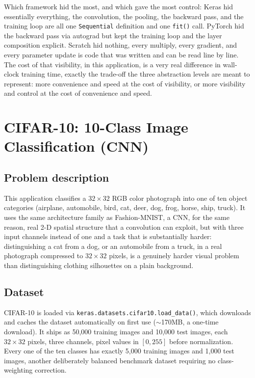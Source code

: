 \documentclass[11pt]{article}
\newcommand{\code}[1]{\texttt{#1}}
\begin{document}
Which framework hid the most, and which gave the most control: Keras hid
essentially everything, the convolution, the pooling, the backward pass, and
the training loop are all one \code{Sequential} definition and one
\code{fit()} call. PyTorch hid the backward pass via autograd but kept the
training loop and the layer composition explicit. Scratch hid nothing, every
multiply, every gradient, and every parameter update is code that was written
and can be read line by line. The cost of that visibility, in this
application, is a very real difference in wall-clock training time, exactly
the trade-off the three abstraction levels are meant to represent: more
convenience and speed at the cost of visibility, or more visibility and
control at the cost of convenience and speed.

\newpage
\section{CIFAR-10: 10-Class Image Classification (CNN)}
\label{sec:cifar10}

\subsection{Problem description}

This application classifies a $32\times32$ RGB color photograph into one of
ten object categories (airplane, automobile, bird, cat, deer, dog, frog,
horse, ship, truck). It uses the same architecture family as Fashion-MNIST,
a CNN, for the same reason, real 2-D spatial structure that a convolution can
exploit, but with three input channels instead of one and a task that is
substantially harder: distinguishing a cat from a dog, or an automobile from
a truck, in a real photograph compressed to $32\times32$ pixels, is a
genuinely harder visual problem than distinguishing clothing silhouettes on a
plain background.

\subsection{Dataset}

CIFAR-10 is loaded via \code{keras.datasets.cifar10.load\_data()}, which
downloads and caches the dataset automatically on first use ($\sim$170MB, a
one-time download). It ships as 50,000 training images and 10,000 test
images, each $32\times32$ pixels, three channels, pixel values in $[0,255]$
before normalization. Every one of the ten classes has exactly 5,000 training
images and 1,000 test images, another deliberately balanced benchmark
dataset requiring no class-weighting correction.
\end{document}
